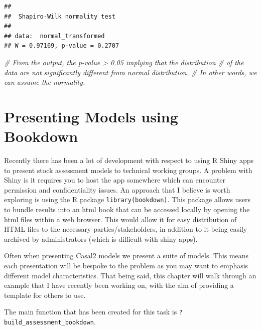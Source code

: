 \documentclass[
]{book}
\newenvironment{Shaded}{\begin{snugshade}}{\end{snugshade}}
\newcommand{\CommentTok}[1]{\textcolor[rgb]{0.56,0.35,0.01}{\textit{#1}}}
\begin{document}
\begin{verbatim}
## 
##  Shapiro-Wilk normality test
## 
## data:  normal_transformed
## W = 0.97169, p-value = 0.2707
\end{verbatim}

\begin{Shaded}
\begin{Highlighting}[]
\CommentTok{\# From the output, the p{-}value \textgreater{} 0.05 implying that the distribution }
\CommentTok{\# of the data are not significantly different from normal distribution. }
\CommentTok{\# In other words, we can assume the normality.}
\end{Highlighting}
\end{Shaded}

\hypertarget{presentwithBookdown}{%
\chapter{Presenting Models using Bookdown}\label{presentwithBookdown}}

Recently there has been a lot of development with respect to using R Shiny apps to present stock assessment models to technical working groups. A problem with Shiny is it requires you to host the app somewhere which can encounter permission and confidentiality issues. An approach that I believe is worth exploring is using the R package \texttt{library(bookdown)}. This package allows users to bundle results into an html book that can be accessed locally by opening the html files within a web browser. This would allow it for easy distribution of HTML files to the necessary parties/stakeholders, in addition to it being easily archived by administrators (which is difficult with shiny apps).

Often when presenting Casal2 models we present a suite of models. This means each presentation will be bespoke to the problem as you may want to emphasis different model characteristics. That being said, this chapter will walk through an example that I have recently been working on, with the aim of providing a template for others to use.

The main function that has been created for this task is \texttt{?build\_assessment\_bookdown}.

  
\end{document}
